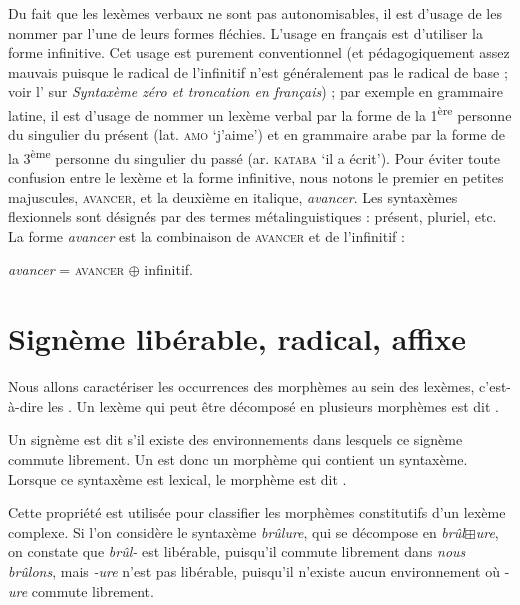 Du fait que les lexèmes verbaux ne sont pas autonomisables, il est d’usage de les nommer par l’une de leurs formes fléchies. L’usage en français est d’utiliser la forme infinitive. Cet usage est purement conventionnel (et pédagogiquement assez mauvais puisque le radical de l’infinitif n’est généralement pas le radical de base ; voir l’ sur \textit{Syntaxème zéro et troncation en français}) ; par exemple en grammaire latine, il est d’usage de nommer un lexème verbal par la forme de la 1\textsuperscript{ère} personne du singulier du présent (lat. \textsc{amo} ‘j’aime’) et en grammaire arabe par la forme de la 3\textsuperscript{ème} personne du singulier du passé (ar. \textsc{kataba} ‘il a écrit’). Pour éviter toute confusion entre le lexème et la forme infinitive, nous notons le premier en petites majuscules, \textsc{avancer}, et la deuxième en italique, \textit{avancer}. Les syntaxèmes flexionnels sont désignés par des termes métalinguistiques : présent, pluriel, etc. La forme \textit{avancer} est la combinaison de \textsc{avancer} et de l’infinitif :

\ea
\textit{avancer} = \textsc{avancer} ${\oplus}$ infinitif.
\z

\section{Signème libérable, radical, affixe}\label{sec:2.2.14}

Nous allons caractériser les occurrences des morphèmes au sein des lexèmes, c’est-à-dire les . Un lexème qui peut être décomposé en plusieurs morphèmes est dit .

\begin{styleLivreImportant}
Un signème est dit  s’il existe des environnements dans lesquels ce signème commute librement. Un  est donc un morphème qui contient un syntaxème. Lorsque ce syntaxème est lexical, le morphème est dit .
\end{styleLivreImportant}

Cette propriété est utilisée pour classifier les morphèmes constitutifs d’un lexème complexe. Si l’on considère le syntaxème \textit{brûlure}, qui se décompose en \textit{brûl}${\boxplus}$\textit{ure}, on constate que \textit{brûl-} est libérable, puisqu’il commute librement dans \textit{nous brûlons}, mais \textit{{}-ure} n’est pas libérable, puisqu’il n’existe aucun environnement où -\textit{ure} commute librement.

